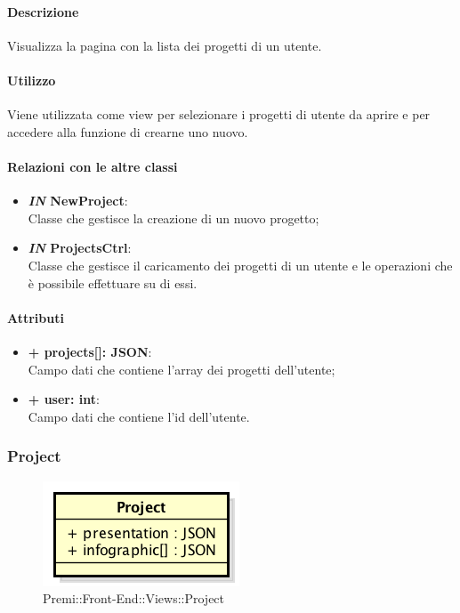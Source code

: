 	\paragraph{Descrizione}
	Visualizza la pagina con la lista dei progetti di un utente.
	
	\paragraph{Utilizzo}
	Viene utilizzata come view per selezionare i progetti di utente da aprire e per accedere alla funzione di crearne uno nuovo.
	
	\paragraph{Relazioni con le altre classi}
	\begin{itemize}
		\item \textbf{\textit{IN} NewProject}:\\
			Classe che gestisce la creazione di un nuovo progetto;
		\item \textbf{\textit{IN} ProjectsCtrl}:\\
			Classe che gestisce il caricamento dei progetti di un utente e le operazioni che è possibile effettuare su di essi.
	\end{itemize}
	
	\paragraph{Attributi}
	\begin{itemize}
		\item \textbf{+ projects[]: JSON}:\\
			Campo dati che contiene l'array dei progetti dell'utente;
		\item \textbf{+ user: int}:\\
			Campo dati che contiene l'id dell'utente.
	\end{itemize}
\newpage
	
	
\subsubsection{Project}
	\begin{figure}[h]
		\centering
		\includegraphics[width=0.3\linewidth]{img/premi_front_end_views_project}
		\caption[Premi::Front-End::Views::Project]{Premi::Front-End::Views::Project}
	\end{figure}
	
